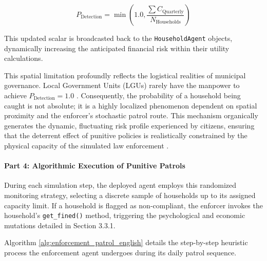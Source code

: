 \begin{equation}
    P_{\mathrm{Detection}} = \min\left(1.0, \frac{\sum C_{\mathrm{Quarterly}}}{N_{\mathrm{Households}}}\right)
    \label{eq:prob_detection}
\end{equation}

This updated scalar is broadcasted back to the \texttt{HouseholdAgent} objects, dynamically increasing the anticipated financial risk within their utility calculations. 

This spatial limitation profoundly reflects the logistical realities of municipal governance. Local Government Units (LGUs) rarely have the manpower to achieve $P_{\mathrm{Detection}} = 1.0$ \citep{Abordo2025}. Consequently, the probability of a household being caught is not absolute; it is a highly localized phenomenon dependent on spatial proximity and the enforcer's stochastic patrol route. This mechanism organically generates the dynamic, fluctuating risk profile experienced by citizens, ensuring that the deterrent effect of punitive policies is realistically constrained by the physical capacity of the simulated law enforcement \citep{Jimenez2025}.

\paragraph{Part 4: Algorithmic Execution of Punitive Patrols}

During each simulation step, the deployed agent employs this randomized monitoring strategy, selecting a discrete sample of households up to its assigned capacity limit. If a household is flagged as non-compliant, the enforcer invokes the household's \texttt{get\_fined()} method, triggering the psychological and economic mutations detailed in Section 3.3.1. 

Algorithm \ref{alg:enforcement_patrol_english} details the step-by-step heuristic process the enforcement agent undergoes during its daily patrol sequence.

